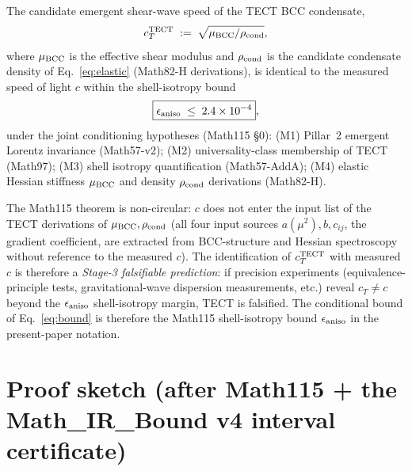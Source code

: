\begin{theorem}[Math115 $c_T^{\rm TECT} = c$ identification, PROVED
CONDITIONAL]
\label{thm:Math115}
The candidate emergent shear-wave speed of the TECT BCC condensate,
\begin{equation}
c_T^{\rm TECT} \;:=\; \sqrt{\mu_{\rm BCC} / \rho_{\rm cond}},
\label{eq:cT-defn}
\end{equation}
where $\mu_{\rm BCC}$ is the effective shear modulus and
$\rho_{\rm cond}$ is the candidate condensate density of
Eq.~\eqref{eq:elastic} (Math82-H derivations), is identical to the
measured speed of light $c$ within the shell-isotropy bound
\begin{equation}
\boxed{\epsilon_{\rm aniso} \;\leq\; 2.4 \times 10^{-4}},
\label{eq:eps-aniso}
\end{equation}
under the joint conditioning hypotheses (Math115 §0):
(M1) Pillar~2 emergent Lorentz invariance (Math57-v2);
(M2) universality-class membership of TECT (Math97);
(M3) shell isotropy quantification (Math57-AddA);
(M4) elastic Hessian stiffness $\mu_{\rm BCC}$ and density
$\rho_{\rm cond}$ derivations (Math82-H).
\end{theorem}

\begin{remark}
\label{rem:non-circular}
The Math115 theorem is non-circular: $c$ does not enter the input
list of the TECT derivations of $\mu_{\rm BCC}, \rho_{\rm cond}$
(all four input sources $a(\mu^2), b, c_{ij}$, the gradient
coefficient, are extracted from BCC-structure and Hessian
spectroscopy without reference to the measured $c$). The
identification of $c_T^{\rm TECT}$ with measured $c$ is therefore a
\emph{Stage-3 falsifiable prediction}: if precision experiments
(equivalence-principle tests, gravitational-wave dispersion
measurements, etc.) reveal $c_T \neq c$ beyond the
$\epsilon_{\rm aniso}$ shell-isotropy margin, TECT is falsified.
The conditional bound of Eq.~\eqref{eq:bound} is therefore the
Math115 shell-isotropy bound $\epsilon_{\rm aniso}$ in the
present-paper notation.
\end{remark}

\section{Proof sketch (after Math115 + the Math\_IR\_Bound v4
interval certificate)}\label{sec:proof}

